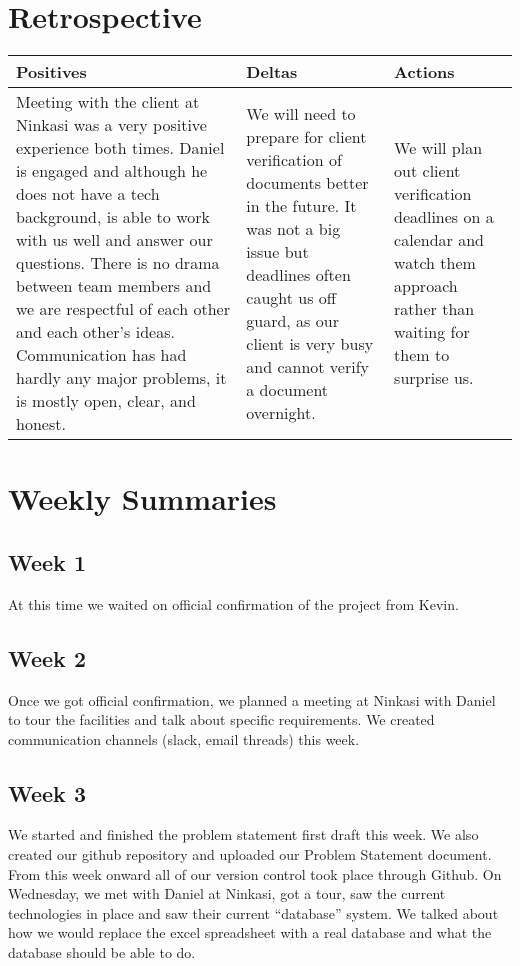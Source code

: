 \documentclass[draftclsnofoot,onecolumn,letterpaper,10pt,compsoc]{IEEEtran}
\begin{document}
\section{Retrospective}
\begin{center}
    \begin{tabular}{ |m{15em}|m{15em}|m{15em}|}
        \hline
             Positives & Deltas & Actions \\
        \hline
            Meeting with the client at Ninkasi was a very positive experience both times. Daniel is engaged and although he does not have a tech background, is able to work with us well and answer our questions. There is no drama between team members and we are respectful of each other and each other’s ideas. Communication has had hardly any major problems, it is mostly open, clear, and honest.
            &
            We will need to prepare for client verification of documents better in the future. It was not a big issue but deadlines often caught us off guard, as our client is very busy and cannot verify a document overnight.
            &
            We will plan out client verification deadlines on a calendar and watch them approach rather than waiting for them to surprise us.
            \\
            \hline
    \end{tabular}
\end{center}

\section{Weekly Summaries}
\subsection{Week 1}
At this time we waited on official confirmation of the project from Kevin.
\subsection{Week 2}
Once we got official confirmation, we planned a meeting at Ninkasi with Daniel to tour the facilities and talk about specific requirements.
We created communication channels (slack, email threads) this week.
\subsection{Week 3}
We started and finished the problem statement first draft this week. We also created our github repository and uploaded our Problem Statement document.
From this week onward all of our version control took place through Github. On Wednesday, we met with Daniel at Ninkasi, got a tour, saw the current technologies in place and saw their current “database” system.
We talked about how we would replace the excel spreadsheet with a real database and what the database should be able to do.
\end{document}
